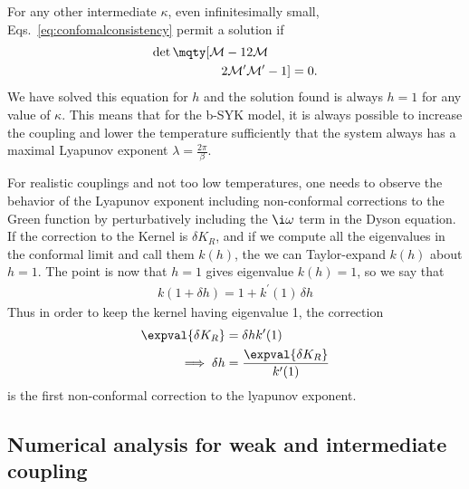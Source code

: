 For any other intermediate $\kappa$, even infinitesimally small, Eqs.~\eqref{eq:confomalconsistency} permit a solution if 
\begin{align}
	\det\mqty[\mathcal{M}-1 & 2\mathcal{M} \\
	2\mathcal{M}^\prime & \mathcal{M}^\prime -1] = 0. 
\end{align}
We have solved this equation for $h$ and the solution found is always $h=1$ for any value of $\kappa$. This means that for the b-SYK model, it is always possible to increase the coupling and lower the temperature sufficiently that the system always has a maximal Lyapunov exponent $\lambda = \frac{2\pi}{\beta}$. 

For realistic couplings and not too low temperatures, one needs to observe the behavior of the Lyapunov exponent including non-conformal corrections to the Green function by perturbatively including the $\i\omega$ term in the Dyson equation.  If the correction to the Kernel is $\delta K_R$, and if we compute all the eigenvalues in the conformal limit and call them $k(h)$, the we can Taylor-expand $k(h)$ about $h=1$. The point is now that $h=1$ gives eigenvalue $k(h) = 1$, so we say that 
\begin{align}
	k(1+\delta h) = 1 + k^\prime(1) \, \delta h 
\end{align}
Thus in order to keep the kernel having eigenvalue 1, the correction 
\begin{align}
	\expval{\delta K_R} &= \delta h k^\prime(1) \nonumber\\
	\implies \delta h &= \frac{\expval{\delta K_R}}{ k^\prime(1)}
\end{align}
is the first non-conformal correction to the lyapunov exponent.


\subsection{Numerical analysis for weak and intermediate coupling}

